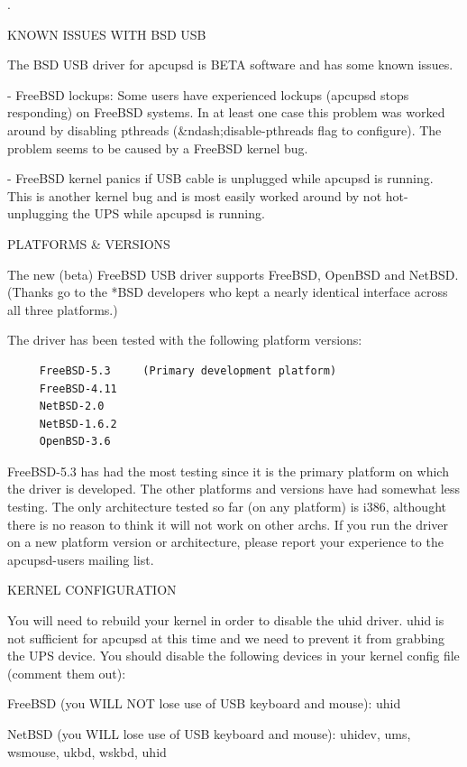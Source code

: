 .  

KNOWN ISSUES WITH BSD USB  

The BSD USB driver for apcupsd is BETA software and has some known issues.  

- FreeBSD lockups: Some users have experienced lockups (apcupsd stops 
responding) on FreeBSD systems. In at least one case this problem was worked 
around by disabling pthreads (\&ndash;disable-pthreads flag to configure). The
 problem seems to be caused by a FreeBSD kernel bug.  

- FreeBSD kernel panics if USB cable is unplugged while apcupsd is running. 
This is another kernel bug and is most easily worked around by not hot- 
unplugging the UPS while apcupsd is running.  

PLATFORMS \& VERSIONS  

The new (beta) FreeBSD USB driver supports FreeBSD, OpenBSD and NetBSD.
(Thanks go to the *BSD developers who kept a nearly identical interface across
all three platforms.)  

The driver has been tested with the following platform versions: 

\footnotesize
\begin{verbatim}
     FreeBSD-5.3     (Primary development platform)
     FreeBSD-4.11
     NetBSD-2.0
     NetBSD-1.6.2
     OpenBSD-3.6
\end{verbatim}
\normalsize

FreeBSD-5.3 has had the most testing since it is the primary platform on which
the driver is developed. The other platforms and versions have had somewhat
less testing. The only architecture tested so far (on any platform) is i386,
althought there is no reason to think it will not work on other archs. If you
run the driver on a new platform version or architecture, please report your
experience to the apcupsd-users mailing list.  

KERNEL CONFIGURATION  

You will need to rebuild your kernel in order to disable the uhid driver. uhid
is not sufficient for apcupsd at this time and we need to prevent it from
grabbing the UPS device. You should disable the following devices in your
kernel config file (comment them out):  

FreeBSD (you WILL NOT lose use of USB keyboard and mouse):  uhid  

NetBSD (you WILL lose use of USB keyboard and mouse):  uhidev, ums, wsmouse,
ukbd, wskbd, uhid  

